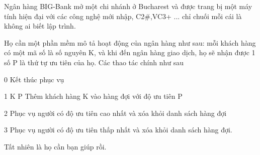 Ngân hàng  BIG-Bank mở một chi nhánh ở Bucharest và được trang bị một máy tính hiện đại với các công nghệ mới nhập, C2\#,VC3+ ... chỉ chuối mỗi cái là không ai biết lập trình.  

   Họ cần một phần mềm mô tả hoạt động của ngân hàng như sau: mỗi khách hàng có một mã số là số nguyên K, và khi đến ngân hàng giao dịch, họ sẽ nhận được 1 số P là thứ tự ưu tiên của họ. Các thao tác chính như sau  

   0  Kết thúc phục vụ  

   1  K P Thêm khách hàng K vào hàng đợi với độ ưu tiên P  

   2  Phục vụ người có độ ưu tiên cao nhất và xóa khỏi danh sách hàng đợi  

   3  Phục vụ người có độ ưu tiên thấp nhất và xóa khỏi danh sách hàng đợi.  

   Tất nhiên là họ cần bạn giúp rồi.  



\